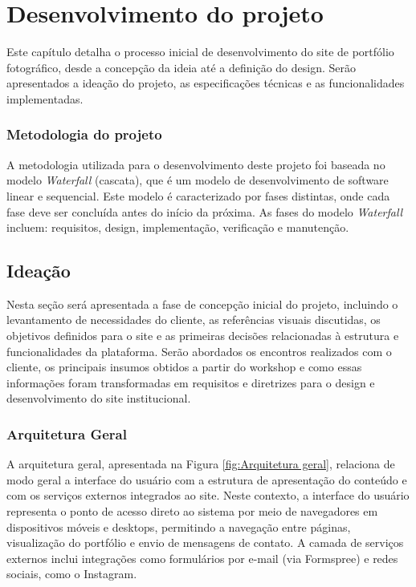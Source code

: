 \chapter{Desenvolvimento do projeto}
\label{chap:metod}
Este capítulo detalha o processo inicial de desenvolvimento do site de portfólio fotográfico, desde a concepção da ideia até a definição do design. Serão apresentados a ideação do projeto, as especificações técnicas e as funcionalidades implementadas.
\subsection{Metodologia do projeto}
A metodologia utilizada para o desenvolvimento deste projeto foi baseada no modelo \textit{Waterfall} (cascata), que é um modelo de desenvolvimento de software linear e sequencial. Este modelo é caracterizado por fases distintas, onde cada fase deve ser concluída antes do início da próxima. As fases do modelo \textit{Waterfall} incluem: requisitos, design, implementação, verificação e manutenção.

\section{Ideação}
Nesta seção será apresentada a fase de concepção inicial do projeto, incluindo o levantamento de necessidades do cliente, as referências visuais discutidas, os objetivos definidos para o site e as primeiras decisões relacionadas à estrutura e funcionalidades da plataforma. Serão abordados os encontros realizados com o cliente, os principais insumos obtidos a partir do workshop e como essas informações foram transformadas em requisitos e diretrizes para o design e desenvolvimento do site institucional.


\subsection{Arquitetura Geral}
A arquitetura geral, apresentada na Figura \ref{fig:Arquitetura geral}, relaciona de modo geral a interface do usuário com a estrutura de apresentação do conteúdo e com os serviços externos integrados ao site. Neste contexto, a interface do usuário representa o ponto de acesso direto ao sistema por meio de navegadores em dispositivos móveis e desktops, permitindo a navegação entre páginas, visualização do portfólio e envio de mensagens de contato. A camada de serviços externos inclui integrações como formulários por e-mail (via Formspree) e redes sociais, como o Instagram.

